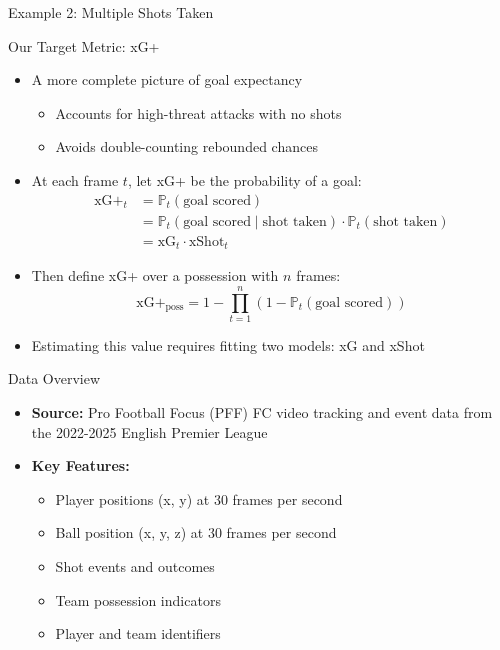 \documentclass{beamer}
\begin{document}
\begin{frame}{Example 2: Multiple Shots Taken}

\end{frame}

\begin{frame}{Our Target Metric: xG+}
\begin{itemize}
\item A more complete picture of goal expectancy
  \begin{itemize}
  \item Accounts for high-threat attacks with no shots
  \item Avoids double-counting rebounded chances
  \end{itemize}
\item At each frame $t$, let xG+ be the probability of a goal:
\begin{align*}
\text{xG+}_t &= \mathbb{P}_t(\text{goal scored}) \\
&= \mathbb{P}_t(\text{goal scored} \mid \text{shot taken})\cdot\mathbb{P}_t(\text{shot taken}) \\
&= \text{xG}_t\cdot\text{xShot}_t
\end{align*}
\item Then define xG+ over a possession with $n$ frames:
$$\text{xG+}_\text{poss} = 1 - \prod_{t = 1}^n \left(1 - \mathbb{P}_t\left(\text{goal scored}\right)\right)$$
\item Estimating this value requires fitting two models: xG and xShot
\end{itemize}
\end{frame}

\begin{frame}{Data Overview}
\begin{itemize}
\item \textbf{Source:} Pro Football Focus (PFF) FC video tracking and event data from the 2022-2025 English Premier League
\item \textbf{Key Features:}
  \begin{itemize}
  \item Player positions (x, y) at 30 frames per second
  \item Ball position (x, y, z) at 30 frames per second
  \item Shot events and outcomes
  \item Team possession indicators
  \item Player and team identifiers
  \end{itemize}
\end{itemize}
\end{frame}
\end{document}
